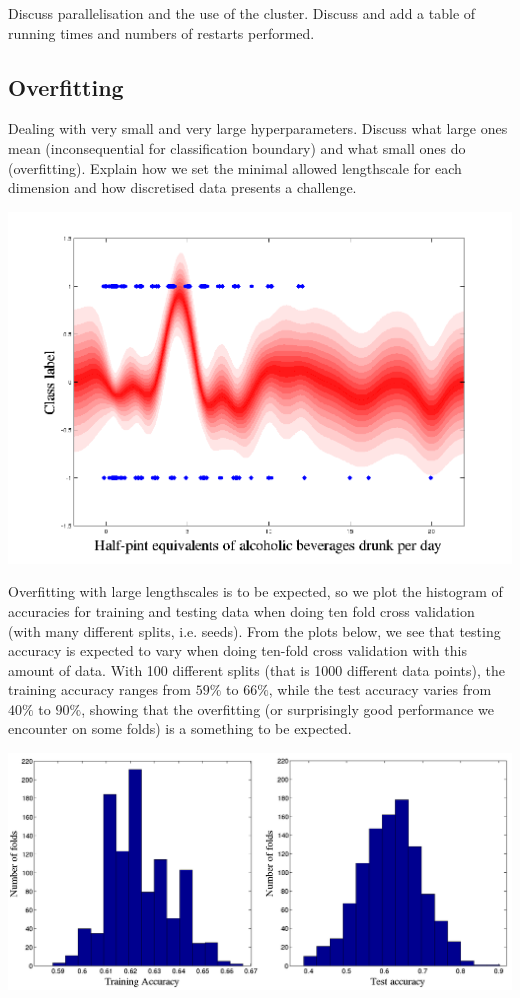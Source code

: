 \documentclass[a4paper,12pt ]{report}
\begin{document}
Discuss parallelisation and the use of the cluster. Discuss and add a table of running times and numbers of restarts performed. 

\subsection{Overfitting}

Dealing with very small and very large hyperparameters. Discuss what large ones mean (inconsequential for classification boundary) and what small ones do (overfitting). Explain how we set the minimal allowed lengthscale for each dimension and how discretised data presents a challenge. 

\includegraphics[trim=2cm 0cm 1cm 1cm, width=1\textwidth] {figures/liversmalllengthscale.png}

Overfitting with large lengthscales is to be expected, so we plot the histogram of accuracies for training and testing data when doing ten fold cross validation (with many different splits, i.e. seeds). From the plots below, we see that testing accuracy is expected to vary
when doing ten-fold cross validation with this amount of data. With 100 different splits (that is 1000 different data points), the training accuracy ranges from $59\%$ to $66\%$, while the test accuracy varies from $40\%$ to $90\%$, showing that the overfitting (or surprisingly 
good performance we encounter on some folds) is a something to be expected. 

\includegraphics[trim=2cm 0cm 1cm 1cm, width=1\textwidth] {figures/overfitwithlargelength.png}
\end{document}
